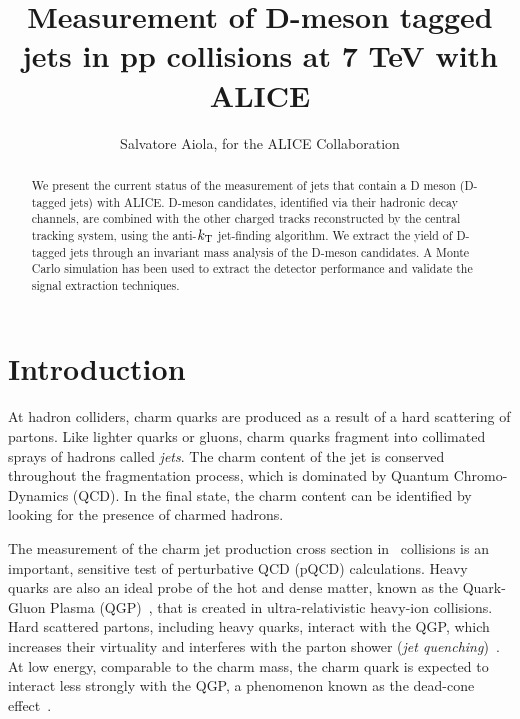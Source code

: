 \documentclass[a4paper]{jpconf}
\begin{document}
\title{Measurement of D-meson tagged jets in pp collisions at 7 TeV with ALICE}

\author{Salvatore Aiola, for the ALICE Collaboration}

\address{Physics Department, Yale University, 266 Whitney Avenue, New Haven, CT 06511}


\begin{abstract}
We present the current status of the measurement of jets that contain a D meson (D-tagged jets) with \mbox{ALICE}.
D-meson candidates, identified via their hadronic decay channels, are combined with the other charged tracks reconstructed by the central tracking system, 
using the anti-$k_{\rm T}$ jet-finding algorithm.
We extract the yield of D-tagged jets through an invariant mass analysis of the D-meson candidates.
A Monte Carlo simulation has been used to extract the detector performance and validate the signal extraction techniques.
\end{abstract}

\section{Introduction}
At hadron colliders, charm quarks are produced as a result of a hard scattering of partons. Like lighter quarks or gluons, charm quarks
fragment into collimated sprays of hadrons called \emph{jets}. The charm content of the jet is conserved throughout the fragmentation process,
which is dominated by Quantum Chromo-Dynamics (QCD).
In the final state, the charm content can be identified by looking for the presence of charmed hadrons.

The measurement of the charm jet production cross section in \pp\ collisions is an important, sensitive test of perturbative QCD (pQCD) calculations.
Heavy quarks are also an ideal probe of the hot and dense matter, 
known as the Quark-Gluon Plasma (QGP)~\cite{STAR:2005a, PHENIX:2005a}, 
that is created in ultra-relativistic heavy-ion collisions. 
Hard scattered partons, including heavy quarks, interact with the QGP, which increases their virtuality and interferes with the
parton shower (\emph{jet quenching})~\cite{PHENIX:2008b, CMS:2012b, ALICE:2015a}.
At low energy, comparable to the charm mass, the charm quark is expected
to interact less strongly with the QGP, a phenomenon known as the dead-cone effect~\cite{Dokshitzer:2001}.
\end{document}

